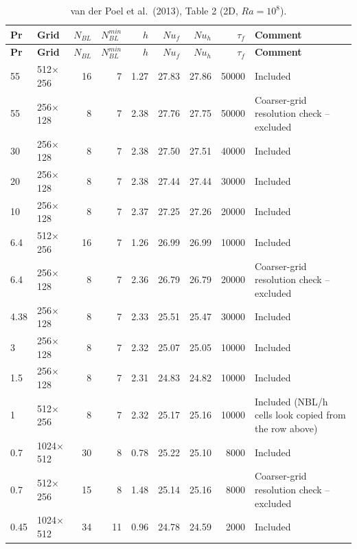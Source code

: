 \documentclass[11pt]{article}
\begin{document}
\begin{longtable}{l l r r r r r r p{4.4cm}}
\caption{van der Poel et al.\ (2013), Table 2 (2D, $Ra=10^8$).}\label{tab:vdp2013}\\
\toprule
\textbf{Pr} & \textbf{Grid} & $N_{BL}$ & $N_{BL}^{min}$ & $h$ & $Nu_f$ & $Nu_h$ & $\tau_f$ & \textbf{Comment} \\
\midrule
\endfirsthead
\toprule
\textbf{Pr} & \textbf{Grid} & $N_{BL}$ & $N_{BL}^{min}$ & $h$ & $Nu_f$ & $Nu_h$ & $\tau_f$ & \textbf{Comment} \\
\midrule
\endhead
\bottomrule
\endfoot
\rowcolor{included} 55 & 512$\times$256 & 16 & 7 & 1.27 & 27.83 & 27.86 & 50000 & Included \\
\rowcolor{excluded} 55 & 256$\times$128 & 8 & 7 & 2.38 & 27.76 & 27.75 & 50000 & Coarser-grid resolution check -- excluded \\
\rowcolor{included} 30 & 256$\times$128 & 8 & 7 & 2.38 & 27.50 & 27.51 & 40000 & Included \\
\rowcolor{included} 20 & 256$\times$128 & 8 & 7 & 2.38 & 27.44 & 27.44 & 30000 & Included \\
\rowcolor{included} 10 & 256$\times$128 & 8 & 7 & 2.37 & 27.25 & 27.26 & 20000 & Included \\
\rowcolor{included} 6.4 & 512$\times$256 & 16 & 7 & 1.26 & 26.99 & 26.99 & 10000 & Included \\
\rowcolor{excluded} 6.4 & 256$\times$128 & 8 & 7 & 2.36 & 26.79 & 26.79 & 20000 & Coarser-grid resolution check -- excluded \\
\rowcolor{included} 4.38 & 256$\times$128 & 8 & 7 & 2.33 & 25.51 & 25.47 & 30000 & Included \\
\rowcolor{included} 3 & 256$\times$128 & 8 & 7 & 2.32 & 25.07 & 25.05 & 10000 & Included \\
\rowcolor{included} 1.5 & 256$\times$128 & 8 & 7 & 2.31 & 24.83 & 24.82 & 10000 & Included \\
\rowcolor{included} 1 & 512$\times$256 & 8 & 7 & 2.32 & 25.17 & 25.16 & 10000 & Included (NBL/h cells look copied from the row above) \\
\rowcolor{included} 0.7 & 1024$\times$512 & 30 & 8 & 0.78 & 25.22 & 25.10 & 8000 & Included \\
\rowcolor{excluded} 0.7 & 512$\times$256 & 15 & 8 & 1.48 & 25.14 & 25.16 & 8000 & Coarser-grid resolution check -- excluded \\
\rowcolor{included} 0.45 & 1024$\times$512 & 34 & 11 & 0.96 & 24.78 & 24.59 & 2000 & Included \\

\end{longtable}
\end{document}
